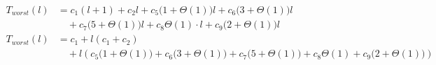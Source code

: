 \begin{subequations}
\label{eq:mergelines-j-1}
\begin{align}
\label{eq:mergelines-j-1-1}
T_{worst}(l)& =
c_{1}(l+1)
+ c_{2}l
+ c_{5}\bigl(1 + \Theta(1)\bigr)l
+ c_{6}\bigl(3 + \Theta(1)\bigr)l
\\
& \quad
+ c_{7}\bigl(5 + \Theta(1)\bigr)l
+ c_{8}\Theta(1) \cdot l
+ c_{9}\bigl(2 + \Theta(1)\bigr)l
\nonumber \\
\label{eq:mergelines-j-1-2}
T_{worst}(l)& =
c_{1}
+ l(c_{1} + c_{2})
\\
& \quad
+ l(c_{5}\bigl(1 + \Theta(1)\bigr) + c_{6}\bigl(3 + \Theta(1)\bigr) + c_{7}\bigl(5 + \Theta(1)\bigr) + c_{8}\Theta(1)
+ c_{9}\bigl(2 + \Theta(1)\bigr))
\nonumber
\end{align}
\end{subequations}
